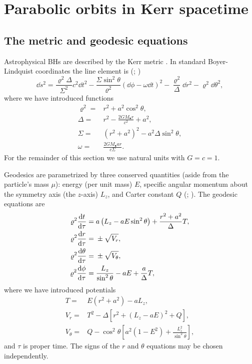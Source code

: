 \section{Parabolic orbits in Kerr spacetime}\label{sec:Geodesic}

\subsection{The metric and geodesic equations}

Astrophysical BHs are described by the Kerr metric \citep{Kerr1963}. In standard Boyer-Lindquist coordinates the line element is (\citealt{Boyer1967}; \citealt[section 13.7]{Hobson2006})
\begin{equation}
\dd s^2 = \frac{\varrho^2 \Delta}{\Sigma^2}c^2\dd t^2 - \frac{\Sigma \sin^2 \theta}{\varrho^2}\left(\dd \phi - \omega \dd t\right)^2 - \frac{\varrho^2}{\Delta}\dd r^2 - \varrho^2\dd \theta^2,
\end{equation}
where we have introduced functions
\begin{subequations}
\begin{align}
\varrho^2 = {} & r^2 + a^2\cos^2\theta,\\
\Delta = {} & r^2 - \frac{2GM_\bullet r}{c^2} + a^2,\\
\Sigma = {} & \left(r^2 +a^2\right)^2 - a^2\Delta\sin^2\theta,\\
\omega = {} & \frac{2GM_\bullet ar}{c\Sigma}.
\end{align}
\end{subequations}
For the remainder of this section we use natural units with $G = c = 1$.

Geodesics are parametrized by three conserved quantities (aside from the particle's mass $\mu$): energy (per unit mass) $E$, specific angular momentum about the symmetry axis (the $z$-axis) $L_z$, and Carter constant $Q$ (\citealt{Carter1968}; \citealt[section 62]{Chandrasekhar1992}). The geodesic equations are
\begin{subequations}
\begin{align}
\varrho^2 \frac{\mathrm{d} {t}}{\mathrm{d} {\tau}} = {} & a\left(L_z - aE\sin^2 \theta\right) + \frac{r^2 + a^2}{\Delta}T,\\
\varrho^2 \frac{\mathrm{d} {r}}{\mathrm{d} {\tau}} = {} & \pm \sqrt{V_r},\\
\varrho^2 \frac{\mathrm{d} {\theta}}{\mathrm{d} {\tau}} = {} & \pm \sqrt{V_\theta},\\
\varrho^2 \frac{\mathrm{d} {\phi}}{\mathrm{d} {\tau}} = {} & \frac{L_z}{\sin^2 \theta} - aE + \frac{a}{\Delta}T,
\end{align}
\end{subequations}
where we have introduced potentials
\begin{subequations}
\begin{align}
T = {} & E\left(r^2 +a^2\right) - aL_z,\\
V_r = {} & T^2 - \Delta\left[r^2 + \left(L_z - aE\right)^2 + Q\right],\\
V_\theta = {} & Q - \cos^2 \theta\left[a^2\left(1 - E^2\right) + \frac{L_z^2}{\sin^2\theta}\right],
\end{align}
\end{subequations}
and $\tau$ is proper time. The signs of the $r$ and $\theta$ equations may be chosen independently.

